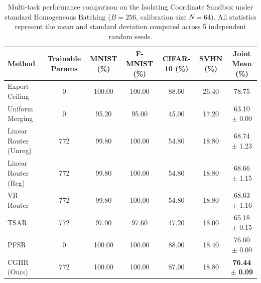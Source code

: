 \begin{table}[t]
\caption{Multi-task performance comparison on the Isolating Coordinate Sandbox under standard Homogeneous Batching ($B=256$, calibration size $N=64$). All statistics represent the mean and standard deviation computed across 5 independent random seeds.}
\label{tab:main_results}
\vskip 0.15in
\begin{center}
\begin{small}
\setlength{\tabcolsep}{3.5pt}
\begin{tabular}{lcccccc}
\toprule
Method & Trainable Params & MNIST (\%) & F-MNIST (\%) & CIFAR-10 (\%) & SVHN (\%) & Joint Mean (\%) \\
\midrule
Expert Ceiling & 0 & 100.00 & 100.00 & 88.60 & 26.40 & 78.75 \\
Uniform Merging & 0 & 95.20 & 95.00 & 45.00 & 17.20 & 63.10 $\pm$ 0.00 \\
\midrule
Linear Router (Unreg) & 772 & 99.80 & 100.00 & 54.80 & 18.80 & 68.74 $\pm$ 1.23 \\
Linear Router (Reg) & 772 & 99.80 & 100.00 & 54.80 & 18.80 & 68.66 $\pm$ 1.15 \\
VR-Router & 772 & 99.80 & 100.00 & 54.80 & 18.80 & 68.63 $\pm$ 1.16 \\
TSAR & 772 & 97.00 & 97.60 & 47.20 & 18.00 & 65.18 $\pm$ 0.15 \\
\midrule
PFSR & 0 & 100.00 & 100.00 & 88.00 & 18.40 & 76.60 $\pm$ 0.00 \\
CGHR (Ours) & 772 & 100.00 & 100.00 & 87.00 & 18.80 & \textbf{76.44} $\pm$ \textbf{0.09} \\
\bottomrule
\end{tabular}
\end{small}
\end{center}
\vskip -0.1in
\end{table}

